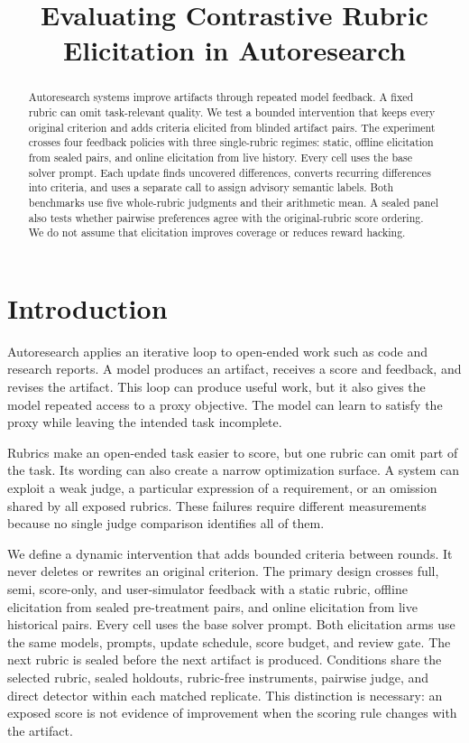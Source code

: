 \documentclass{article} %
\title{Evaluating Contrastive Rubric Elicitation in Autoresearch}
\author{
}
\begin{document}
\maketitle

\begin{abstract}
Autoresearch systems improve artifacts through repeated model feedback. A fixed rubric can omit task-relevant quality. We test a bounded intervention that keeps every original criterion and adds criteria elicited from blinded artifact pairs. The experiment crosses four feedback policies with three single-rubric regimes: static, offline elicitation from sealed pairs, and online elicitation from live history. Every cell uses the base solver prompt. Each update finds uncovered differences, converts recurring differences into criteria, and uses a separate call to assign advisory semantic labels. Both benchmarks use five whole-rubric judgments and their arithmetic mean. A sealed panel also tests whether pairwise preferences agree with the original-rubric score ordering. We do not assume that elicitation improves coverage or reduces reward hacking.

\end{abstract}

\section{Introduction}

Autoresearch applies an iterative loop to open-ended work such as code and research reports. A model produces an artifact, receives a score and feedback, and revises the artifact. This loop can produce useful work, but it also gives the model repeated access to a proxy objective. The model can learn to satisfy the proxy while leaving the intended task incomplete.

Rubrics make an open-ended task easier to score, but one rubric can omit part of the task. Its wording can also create a narrow optimization surface. A system can exploit a weak judge, a particular expression of a requirement, or an omission shared by all exposed rubrics. These failures require different measurements because no single judge comparison identifies all of them.

We define a dynamic intervention that adds bounded criteria between rounds. It never deletes or rewrites an original criterion. The primary design crosses full, semi, score-only, and user-simulator feedback with a static rubric, offline elicitation from sealed pre-treatment pairs, and online elicitation from live historical pairs. Every cell uses the base solver prompt. Both elicitation arms use the same models, prompts, update schedule, score budget, and review gate. The next rubric is sealed before the next artifact is produced. Conditions share the selected rubric, sealed holdouts, rubric-free instruments, pairwise judge, and direct detector within each matched replicate. This distinction is necessary: an exposed score is not evidence of improvement when the scoring rule changes with the artifact.
\end{document}
